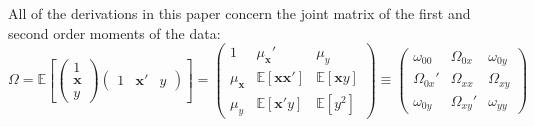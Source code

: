 \documentclass[11pt]{asaproc}
\newcommand{\Expect}{\mathbb{E}}
\newcommand{\bfx}{\mathbf{x}}
\begin{document}
All of the derivations in this paper concern the joint matrix of the first and second order moments of the data:
\begin{equation}
    \Omega =
    \Expect
    \left[
    \begin{pmatrix}
      1 \\
      \bfx \\
      y
    \end{pmatrix}
    \begin{pmatrix}
      1 &
      \bfx' &
      y
    \end{pmatrix}
    \right]
    =
    \begin{pmatrix}
      1 & \mu_\mathbf{x}' & \mu_y \\
      \mu_\mathbf{x} & \Expect[ \bfx \bfx'] & \Expect[\bfx y] \\
      \mu_y & \Expect[\bfx' y] & \Expect[y^2]
    \end{pmatrix}
    \equiv
    \begin{pmatrix}
      \omega_{00} & \Omega_{0x} & \omega_{0y} \\
      \Omega_{0x}' & \Omega_{xx} & \Omega_{xy} \\
      \omega_{0y} & \Omega_{xy}' & \omega_{yy}
    \end{pmatrix}
    \label{eq:Omega}
\end{equation}
\end{document}
